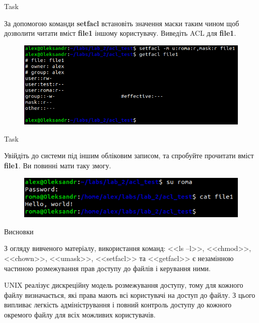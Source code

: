 \documentclass[a4paper,12pt]{article}
\newcommand{\RomanNumeralCaps}[1]{\MakeUppercase{\romannumeral #1}}
\begin{document}
\newpage
    \begin{center}
        \Large{Task \RomanNumeralCaps{21}}
    \end{center}
    За допомогою команди \textbf{setfacl} встановіть значення маски таким чином щоб дозволити читати вміст \textbf{file1} іншому користувачу. Виведіть ACL для \textbf{file1}.
    \begin{figure}[h!]
        \begin{minipage}[h]{1\linewidth}
            \centering
            \includegraphics[width=0.6\linewidth]{Prt sc/Figure_21.png}  
        \end{minipage}
    \end{figure}

    \begin{center}
        \Large{Task \RomanNumeralCaps{22}}
    \end{center}
    Увійдіть до системи під іншим обліковим записом, та спробуйте прочитати вміст \textbf{file1}. Ви повинні мати таку змогу.
    \begin{figure}[h!]
        \begin{minipage}[h]{1\linewidth}
            \centering
            \includegraphics[width=0.6\linewidth]{Prt sc/Figure_22.png}  
        \end{minipage}
    \end{figure}

    \begin{center}
        \Large{Висновки}
    \end{center}
    
    З огляду вивченого матеріалу, використання команд: <<ls –l>>, <<chmod>>, <<chown>>, <<umask>>, <<setfacl>> та <<getfacl>> є незамінною частиною 
    розмежування прав доступу до файлів і керування ними.

    UNIX реалізує дискреційну модель розмежування доступу, тому для кожного файлу визначається, які права мають всі користувачі на доступ до файлу.
    З цього випливає легкість адміністрування і повний контроль доступу до кожного окремого файлу для всіх можливих користувачів. 
    
\end{document}
